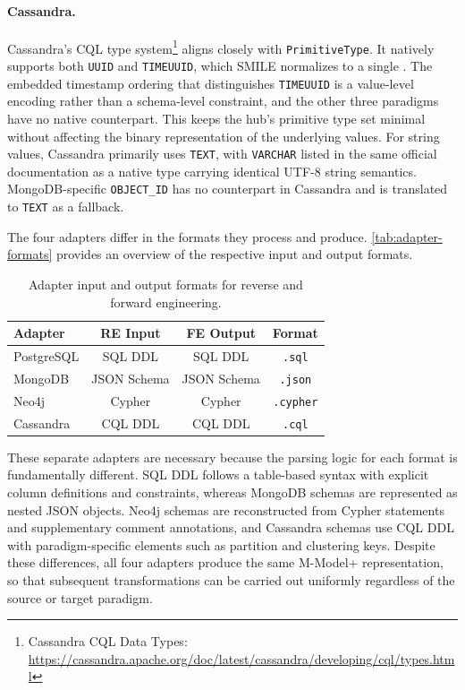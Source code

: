 \paragraph{Cassandra.}
  Cassandra's CQL type system\footnote{Cassandra CQL Data Types:
  \url{https://cassandra.apache.org/doc/latest/cassandra/developing/cql/types.html}}
  aligns closely with \texttt{Primi\-tive\-Type}. It natively supports
  both \texttt{UUID} and \texttt{TIMEUUID}, which SMILE normalizes to
  a single . The embedded timestamp ordering that
  distinguishes \texttt{TIMEUUID} is a value-level encoding rather
  than a schema-level constraint, and the other three paradigms have
  no native counterpart. This keeps the hub's primitive type set
  minimal without affecting the binary representation of the
  underlying values. For string values, Cassandra primarily uses
  \texttt{TEXT}, with \texttt{VARCHAR} listed in the same official
  documentation as a native type carrying identical UTF-8 string
  semantics. MongoDB-specific \texttt{OBJECT\_ID} has no counterpart
  in Cassandra and is translated to \texttt{TEXT} as a fallback.

  The four adapters differ in the formats they process and produce. \autoref{tab:adapter-formats} provides an overview of the respective input and
  output formats.

  \begin{table}[htbp]
  \centering
  \caption{Adapter input and output formats for reverse and forward engineering.}
  \label{tab:adapter-formats}
  \renewcommand{\arraystretch}{1.2}
  \setlength{\tabcolsep}{6pt}
  \scriptsize
  \begin{tabular}{lccc}
  \toprule
  \textbf{Adapter} & \textbf{RE Input} & \textbf{FE Output} & \textbf{Format} \\
  \midrule
  PostgreSQL & SQL DDL & SQL DDL & \texttt{.sql} \\
  MongoDB & JSON Schema & JSON Schema & \texttt{.json} \\
  Neo4j & Cypher & Cypher & \texttt{.cypher} \\
  Cassandra & CQL DDL & CQL DDL & \texttt{.cql} \\
  \bottomrule
  \end{tabular}
  \end{table}

  These separate adapters are necessary because the parsing logic for each format is fundamentally different. SQL DDL follows a table-based syntax
  with explicit column definitions and constraints, whereas MongoDB schemas are represented as nested JSON objects. Neo4j schemas are reconstructed
  from Cypher statements and supplementary comment annotations, and Cassandra schemas use CQL DDL with paradigm-specific elements such as partition
  and clustering keys. Despite these differences, all four adapters produce the same M-Model+ representation, so that subsequent transformations can
   be carried out uniformly regardless of the source or target paradigm.

